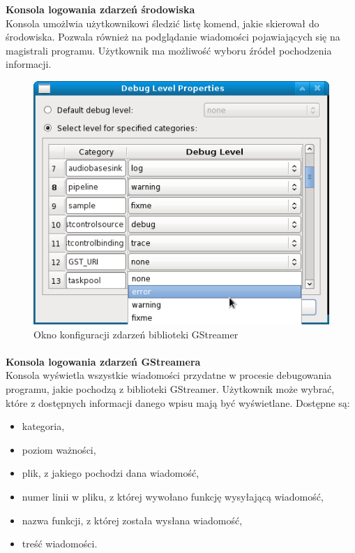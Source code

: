 \documentclass[12pt]{article}
\begin{document}
\textbf{Konsola logowania zdarzeń środowiska} \\
Konsola umożlwia użytkownikowi śledzić listę komend, jakie skierował do środowiska. Pozwala również na podglądanie wiadomości pojawiających się na magistrali programu. Użytkownik ma możliwość wyboru źródeł pochodzenia informacji.
\begin{figure}[H]
  \includegraphics[width=130mm]{img/debug-level-properties.png}
  \caption{Okno konfiguracji zdarzeń biblioteki GStreamer}
  \label{fig:debugLevelProperties}
\end{figure}
\paragraph{}\vspace{-3mm}
\textbf{Konsola logowania zdarzeń GStreamera} \\
Konsola wyświetla wszystkie wiadomości przydatne w procesie debugowania programu, jakie pochodzą z biblioteki GStreamer. Użytkownik może wybrać, które z dostępnych informacji danego wpisu mają być wyświetlane. Dostępne są:
\begin{itemize}
 \setlength{\itemsep}{0em}
\item kategoria,
\item poziom ważności,
\item plik, z jakiego pochodzi dana wiadomość,
\item numer linii w pliku, z której wywołano funkcję wysyłającą wiadomość,
\item nazwa funkcji, z której została wysłana wiadomość,
\item treść wiadomości.
\end{itemize}
\end{document}
